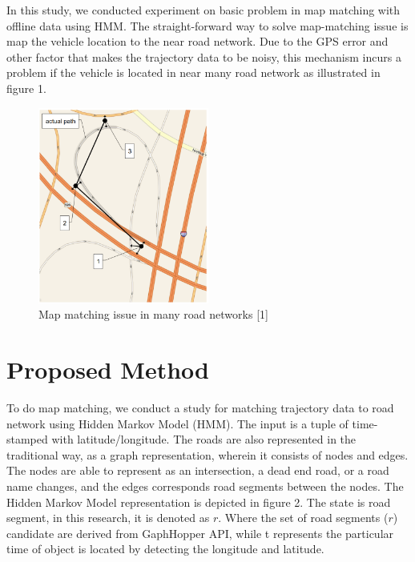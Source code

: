 \documentclass[a4paper]{article}
\begin{document}
In this study, we conducted experiment on basic problem in map matching with offline data using HMM.
The straight-forward way to solve map-matching issue is map the vehicle location to the near road network. Due to the GPS error and other factor that makes the trajectory data to be noisy, this mechanism incurs a problem if the vehicle is located in near many road network as illustrated in figure 1.

\begin{figure}
\centering
\includegraphics[width=0.5\textwidth]{fig1.png}
\caption{\label{fig:data} Map matching issue in many road networks [1]}
\end{figure}

\section{Proposed Method}
\label{sec:method}

To do map matching, we conduct a study for matching trajectory data to road network using Hidden Markov Model (HMM). The input is a tuple of time-stamped with latitude/longitude. The roads are also represented in the traditional way, as a graph representation, wherein it consists of nodes and edges. The nodes are able to represent as an intersection, a dead end road, or a road name changes, and the edges corresponds road segments between the nodes. The Hidden Markov Model representation is depicted in figure 2. The state is road segment, in this research, it is denoted as $r$. Where the set of road segments ($r$) candidate are derived from GaphHopper API, while t represents the particular time of object is located by detecting the longitude and latitude.
\end{document}
